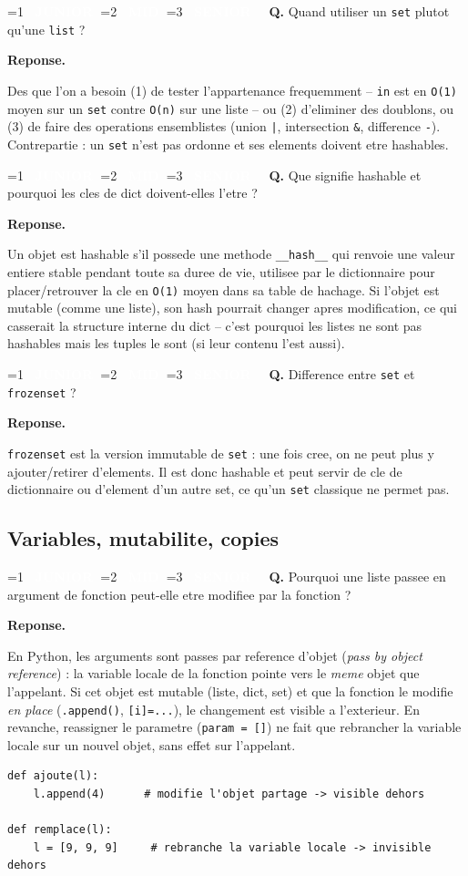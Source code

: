 \documentclass[11pt,a4paper]{article}
\newcommand{\badgeJ}{\textcolor{white}{\colorbox{junior}{\small\bfseries\ JUNIOR\ }}}
\newcommand{\badgeM}{\textcolor{white}{\colorbox{mid}{\small\bfseries\ MID\ }}}
\newcommand{\badgeS}{\textcolor{white}{\colorbox{senior}{\small\bfseries\ SENIOR\ }}}
\newcounter{qcount}
\newenvironment{qa}[2]{%
  \stepcounter{qcount}%
  \par\vspace{6pt}%
  \noindent\colorbox{qbg}{\parbox{\dimexpr\linewidth-12pt}{\vspace{2pt}%
  \ifnum#1=1 \badgeJ\fi\ifnum#1=2 \badgeM\fi\ifnum#1=3 \badgeS\fi
  \ \textbf{Q\theqcount.} #2\vspace{2pt}}}\par\vspace{4pt}%
  \noindent\textbf{\color{accent}Reponse.}\ \ignorespaces
}{%
  \par\vspace{8pt}%
}
\begin{document}
\begin{qa}{1}{Quand utiliser un \texttt{set} plutot qu'une \texttt{list} ?}
Des que l'on a besoin (1) de tester l'appartenance frequemment -- \texttt{in}
est en \texttt{O(1)} moyen sur un \texttt{set} contre \texttt{O(n)} sur une
liste -- ou (2) d'eliminer des doublons, ou (3) de faire des operations
ensemblistes (union \texttt{|}, intersection \texttt{\&}, difference
\texttt{-}). Contrepartie : un \texttt{set} n'est pas ordonne et ses elements
doivent etre hashables.
\end{qa}

\begin{qa}{2}{Que signifie \og{}hashable\fg{} et pourquoi les cles de dict doivent-elles l'etre ?}
Un objet est hashable s'il possede une methode \texttt{\_\_hash\_\_} qui renvoie
une valeur entiere stable pendant toute sa duree de vie, utilisee par le
dictionnaire pour placer/retrouver la cle en \texttt{O(1)} moyen dans sa table
de hachage. Si l'objet est mutable (comme une liste), son hash pourrait changer
apres modification, ce qui casserait la structure interne du dict -- c'est
pourquoi les listes ne sont pas hashables mais les tuples le sont (si leur
contenu l'est aussi).
\end{qa}

\begin{qa}{2}{Difference entre \texttt{set} et \texttt{frozenset} ?}
\texttt{frozenset} est la version immutable de \texttt{set} : une fois cree, on
ne peut plus y ajouter/retirer d'elements. Il est donc hashable et peut servir
de cle de dictionnaire ou d'element d'un autre set, ce qu'un \texttt{set}
classique ne permet pas.
\end{qa}

\subsection{Variables, mutabilite, copies}

\begin{qa}{1}{Pourquoi une liste passee en argument de fonction peut-elle etre modifiee par la fonction ?}
En Python, les arguments sont passes \og{}par reference d'objet\fg{}
(\emph{pass by object reference}) : la variable locale de la fonction pointe
vers le \emph{meme} objet que l'appelant. Si cet objet est mutable (liste,
dict, set) et que la fonction le modifie \emph{en place} (\texttt{.append()},
\texttt{[i]=...}), le changement est visible a l'exterieur. En revanche,
reassigner le parametre (\texttt{param = []}) ne fait que rebrancher la
variable locale sur un nouvel objet, sans effet sur l'appelant.
\begin{lstlisting}
def ajoute(l):
    l.append(4)      # modifie l'objet partage -> visible dehors

def remplace(l):
    l = [9, 9, 9]     # rebranche la variable locale -> invisible dehors
\end{lstlisting}
\end{qa}
\end{document}
